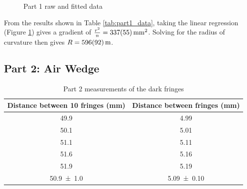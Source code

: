 \documentclass[a4paper]{scrartcl}
\begin{document}
\begin{figure}
    \centering
    \caption{Part 1 raw and fitted data}
    \label{fig:part1_graph}
\end{figure}

From the results shown in Table \ref{tab:part1_data}, taking the linear regression (Figure \ref{fig:part1_graph}) gives a gradient of \(\frac{r^2}{n} = \SI{337 \pm 55}{\milli\metre\squared}\). Solving for the radius of curvature then gives \(R = \SI{596 \pm 92}{\metre}\).

\subsection{Part 2: Air Wedge}
\begin{table}
    \centering
    \begin{tabular}{c | c}
        Distance between 10 fringes (\si{\milli\metre}) & Distance between fringes (\si{\milli\metre}) \\
        \hline
        49.9 & 4.99 \\
        50.1 & 5.01 \\
        51.1 & 5.11 \\
        51.6 & 5.16 \\
        51.9 & 5.19 \\
        \hdashline
        \SI{50.9 \pm 1.0}{} & \SI{5.09 \pm 0.10}{} \\
        \hline
    \end{tabular}
    \caption{Part 2 measurements of the dark fringes}
    \label{tab:part2_data}
\end{table}
\end{document}
